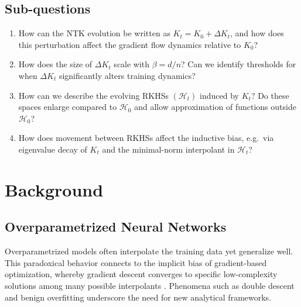 \documentclass[11pt,a4paper]{article}
\begin{document}

\subsection*{Sub-questions}
\begin{enumerate}
	\item How can the NTK evolution be written as $K_t = K_0 + \Delta K_t$, and how does this perturbation affect the gradient flow dynamics relative to $K_0$?
	\item How does the size of $\Delta K_t$ scale with $\beta = d/n$? Can we identify thresholds for when $\Delta K_t$ significantly alters training dynamics?
	\item How can we describe the evolving RKHSs $(\mathcal H_t)$ induced by $K_t$? Do these spaces enlarge compared to $\mathcal H_0$ and allow approximation of functions outside $\mathcal H_0$?
	\item How does movement between RKHSs affect the inductive bias, e.g.\ via eigenvalue decay of $K_t$ and the minimal-norm interpolant in $\mathcal H_t$?
\end{enumerate}

\section{Background}

\subsection{Overparametrized Neural Networks}
Overparametrized models often interpolate the training data yet generalize
well. This paradoxical behavior connects to the implicit bias of gradient-based
optimization, whereby gradient descent converges to specific low-complexity
solutions among many possible interpolants
\citep{soudry2024implicit,gunasekar2018implicit}. Phenomena such as double
descent and benign overfitting underscore the need for new analytical
frameworks.
\end{document}

